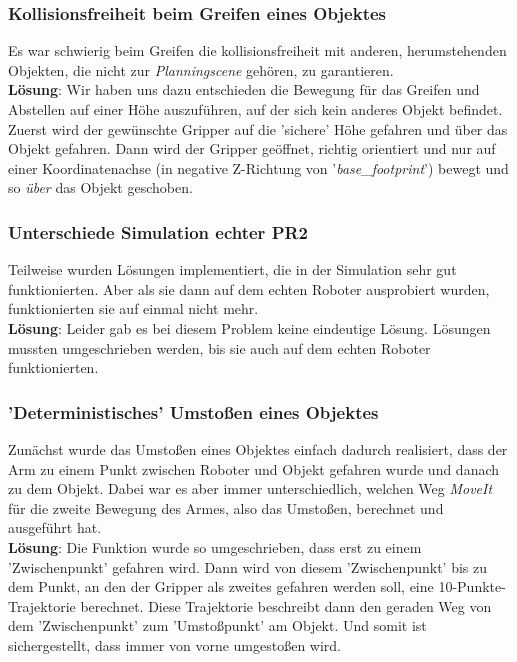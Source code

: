\documentclass{suturo}
\begin{document}
\subsubsection*{Kollisionsfreiheit beim Greifen eines Objektes}
Es war schwierig beim Greifen die kollisionsfreiheit mit anderen, herumstehenden Objekten, die nicht zur \textit{Planningscene} gehören, zu garantieren.\\
\textbf{Lösung}: Wir haben uns dazu entschieden die Bewegung für das Greifen und Abstellen auf einer Höhe auszuführen, auf der sich kein anderes Objekt befindet. Zuerst wird der gewünschte Gripper auf die 'sichere' Höhe gefahren und über das Objekt gefahren. Dann wird der Gripper geöffnet, richtig orientiert und nur auf einer Koordinatenachse (in negative Z-Richtung von '\textit{base\_footprint}') bewegt und so \textit{über} das Objekt geschoben.\\

\subsubsection*{Unterschiede Simulation echter PR2}
Teilweise wurden Lösungen implementiert, die in der Simulation sehr gut funktionierten. Aber als sie dann auf dem echten Roboter ausprobiert wurden,
funktionierten sie auf einmal nicht mehr.\\
\textbf{Lösung}: Leider gab es bei diesem Problem keine eindeutige Lösung. Lösungen mussten umgeschrieben werden, bis sie auch auf dem echten Roboter funktionierten.

\subsubsection*{'Deterministisches' Umstoßen eines Objektes}
Zunächst wurde das Umstoßen eines Objektes einfach dadurch realisiert, dass der Arm zu einem Punkt zwischen Roboter und Objekt gefahren wurde und danach zu dem Objekt. Dabei war es aber immer unterschiedlich, welchen Weg \textit{MoveIt} für die zweite Bewegung des Armes, also das Umstoßen, berechnet und ausgeführt hat.\\
\textbf{Lösung}: Die Funktion wurde so umgeschrieben, dass erst zu einem 'Zwischenpunkt' gefahren wird. Dann wird von diesem 'Zwischenpunkt' bis zu dem Punkt, an den der Gripper als zweites gefahren werden soll, eine 10-Punkte-Trajektorie berechnet. Diese Trajektorie beschreibt dann den geraden Weg von dem 'Zwischenpunkt' zum 'Umstoßpunkt' am Objekt. Und somit ist sichergestellt, dass immer von vorne umgestoßen wird.
\end{document}
